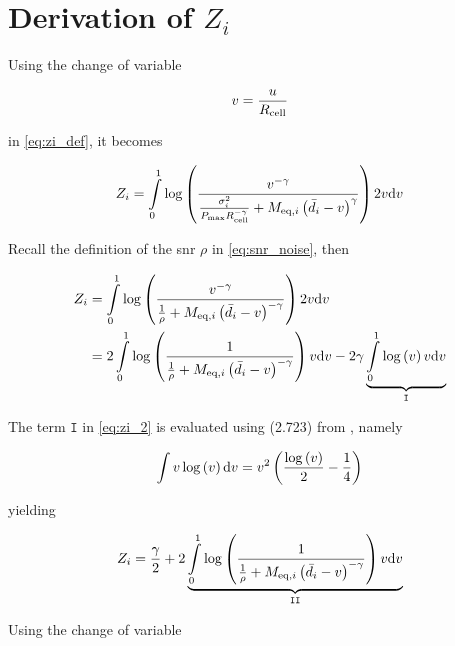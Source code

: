 \chapter{Derivation of $Z_i$}\label{ch:appendix_a}

Using the change of variable

\begin{equation} \label{eq:change_variable_1}
    v = \frac{u}{R_{\text{cell}}}
\end{equation}

\noindent
in \eqref{eq:zi_def}, it becomes

\begin{equation} \label{eq:zi_1}
    Z_i = \int\limits_0^1\log\left(\frac{v^{-\gamma}}{\frac{\sigma_i^2}
    {P_{\max}R_{\text{cell}}^{-\gamma}} + M_{\text{eq},i}\left(\bar{d}_i - v\right)^{\gamma}}
    \right)2v \text{d} v
\end{equation}

Recall the definition of the \gls{snr} $\rho$ in \eqref{eq:snr_noise}, then

\begin{equation} \label{eq:zi_2}
\begin{aligned}
    Z_i &= \int\limits_0^1\log\left(\frac{v^{-\gamma}}{\frac{1}{\rho} + M_{\text{eq},i}
    \left(\bar{d}_i-v\right)^{-\gamma}}\right)2v \text{d} v\\
    &= 2 \int\limits_0^1\log\left(\frac{1}{\frac{1}{\rho}+M_{\text{eq},i}\left(\bar{d}_i-
    v\right)^{-\gamma}}\right)v\text{d} v - 2\gamma
    \underbrace{\int\limits_0^1\log\left(v\right) v\text{d} v}_{\mathtt{I}}
\end{aligned}
\end{equation}

The term $\mathtt{I}$ in \eqref{eq:zi_2} is evaluated using (2.723) from
\cite{gradshteyn00}, namely

\begin{equation} \label{eq:zi_term1}
    \int v\log\left(v\right)\text{d} v = v^2\left(\frac{\log\left(v\right)}{2} -
    \frac{1}{4}\right)
\end{equation}

\noindent
yielding

\begin{equation} \label{eq:zi_3}
    Z_i = \frac{\gamma}{2} + 2\underbrace{\int\limits_0^1\log\left(\frac{1}
        {\frac{1}{\rho} + M_{\text{eq},i}\left(\bar{d}_i-v\right)^{-\gamma}}\right)
        v\text{d} v}_{\mathtt{II}}
\end{equation}

Using the change of variable

